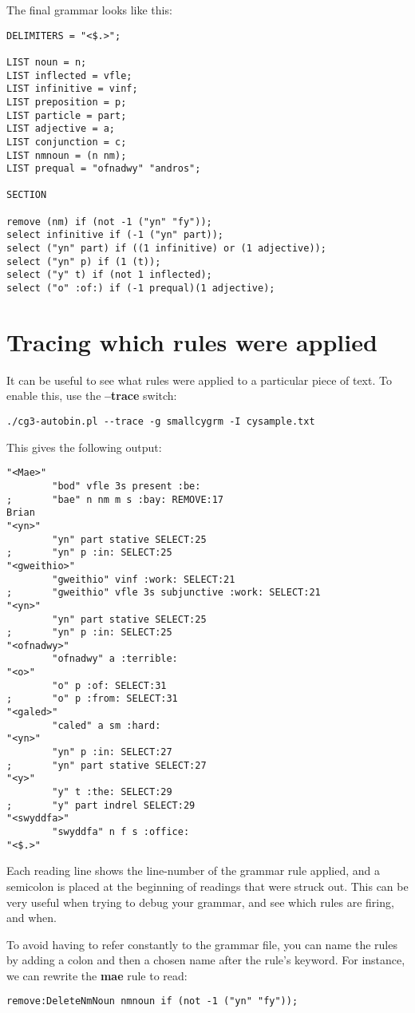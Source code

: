 \documentclass[a4paper,10pt]{article}
\begin{document}
The final grammar looks like this:
\begin{Verbatim}
DELIMITERS = "<$.>";

LIST noun = n;
LIST inflected = vfle;
LIST infinitive = vinf;
LIST preposition = p;
LIST particle = part;
LIST adjective = a;
LIST conjunction = c;
LIST nmnoun = (n nm);
LIST prequal = "ofnadwy" "andros";

SECTION

remove (nm) if (not -1 ("yn" "fy"));
select infinitive if (-1 ("yn" part));
select ("yn" part) if ((1 infinitive) or (1 adjective));
select ("yn" p) if (1 (t));
select ("y" t) if (not 1 inflected);
select ("o" :of:) if (-1 prequal)(1 adjective);
\end{Verbatim}

\section{Tracing which rules were applied}

It can be useful to see what rules were applied to a particular piece of text.  To enable this, use the \textbf{--trace} switch:
\begin{Verbatim}
./cg3-autobin.pl --trace -g smallcygrm -I cysample.txt 
\end{Verbatim}

This gives the following output:
\begin{Verbatim}[tabsize=4]
"<Mae>"
        "bod" vfle 3s present :be:
;       "bae" n nm m s :bay: REMOVE:17
Brian
"<yn>"
        "yn" part stative SELECT:25
;       "yn" p :in: SELECT:25
"<gweithio>"
        "gweithio" vinf :work: SELECT:21
;       "gweithio" vfle 3s subjunctive :work: SELECT:21
"<yn>"
        "yn" part stative SELECT:25
;       "yn" p :in: SELECT:25
"<ofnadwy>"
        "ofnadwy" a :terrible:
"<o>"
        "o" p :of: SELECT:31
;       "o" p :from: SELECT:31
"<galed>"
        "caled" a sm :hard:
"<yn>"
        "yn" p :in: SELECT:27
;       "yn" part stative SELECT:27
"<y>"
        "y" t :the: SELECT:29
;       "y" part indrel SELECT:29
"<swyddfa>"
        "swyddfa" n f s :office:
"<$.>"
\end{Verbatim}
Each reading line shows the line-number of the grammar rule applied, and a semicolon is placed at the beginning of readings that were struck out.  This can be very useful when trying to debug your grammar, and see which rules are firing, and when.

To avoid having to refer constantly to the grammar file, you can name the rules by adding a colon and then a chosen name after the rule's keyword.  For instance, we can rewrite the \textbf{mae} rule to read:
\begin{Verbatim}[tabsize=4]
remove:DeleteNmNoun nmnoun if (not -1 ("yn" "fy"));
\end{Verbatim}
\end{document}
